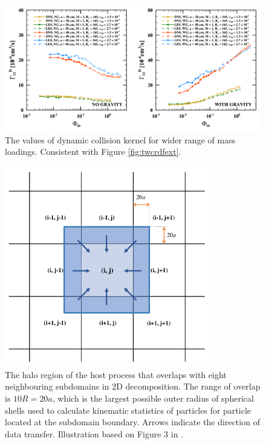 
\begin{figure}
\centering
\includegraphics[width=13.5cm]{figures/2-13_twcgammaext.pdf}
\caption{
The values of dynamic collision kernel for wider range of mass loadings.
Consistent with Figure \ref{fig:twcrdfext}.
}
\label{fig:twcgammaext}
\end{figure}





\begin{figure}
\centering
\includegraphics[width=9cm]{figures/3-01_halo.pdf}
\caption{
The halo region of the host process that overlaps with eight neighbouring subdomains in 2D decomposition.
The range of overlap is $10R = 20a$, which is the largest possible outer radius of spherical shells used to calculate kinematic statistics of particles for particle located at the subdomain boundary.
Arrows indicate the direction of data transfer.
Illustration based on Figure 3 in \textcite{Ayala2014}. 
}
\label{fig:halo}
\end{figure}

